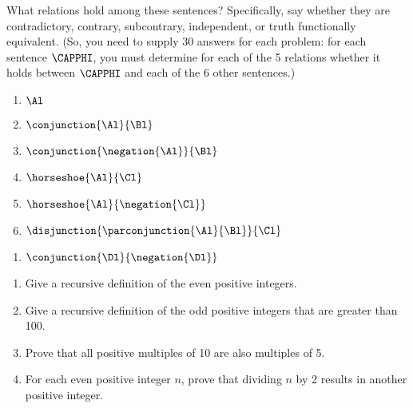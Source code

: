 
What relations hold among these sentences? Specifically, say whether they are contradictory, contrary, subcontrary, independent, or truth functionally equivalent. (So, you need to supply 30 answers for each problem: for each sentence $\CAPPHI$, you must determine for each of the 5 relations whether it holds between $\CAPPHI$ and each of the 6 other sentences.) 
\begin{multicols}{2}
\begin{enumerate}
\item {$\Al$}
\item {$\conjunction{\Al}{\Bl}$}
\item {$\conjunction{\negation{\Al}}{\Bl}$}
\item {$\horseshoe{\Al}{\Cl}$}
\item {$\horseshoe{\Al}{\negation{\Cl}}$}
\item {$\disjunction{\parconjunction{\Al}{\Bl}}{\Cl}$}
\end{enumerate}
\end{multicols}
\begin{enumerate}[start=7]
\item {$\conjunction{\Dl}{\negation{\Dl}}$}
\end{enumerate}



\begin{enumerate}
	\item Give a recursive definition of the even positive integers. 
	\item Give a recursive definition of the odd positive integers that are greater than 100. 
	\item Prove that all positive multiples of 10 are also multiples of 5.
	\item For each even positive integer $n$, prove that dividing $n$ by 2 results in another positive integer.
\end{enumerate}


